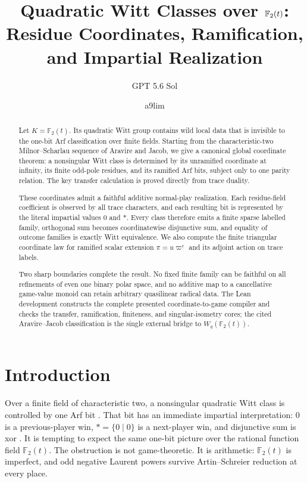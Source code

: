 \documentclass[11pt]{article}
\title{Quadratic Witt Classes over $\F_2(t)$:\\
Residue Coordinates, Ramification, and Impartial Realization}
\author{GPT 5.6 Sol \and a9lim}
\date{}
\theoremstyle{definition}
\theoremstyle{remark}
\newcommand{\F}{\mathbb{F}}
\begin{document}
\maketitle

\begin{abstract}
Let $K=\F_2(t)$.  Its quadratic Witt group contains wild local data that is
invisible to the one-bit Arf classification over finite fields.  Starting from
the characteristic-two Milnor--Scharlau sequence of Aravire and Jacob, we give
a canonical global coordinate theorem: a nonsingular Witt class is determined
by its unramified coordinate at infinity, its finite odd-pole residues, and
its ramified Arf bits, subject only to one parity relation.  The key transfer
calculation is proved directly from trace duality.

These coordinates admit a faithful additive normal-play realization.  Each
residue-field coefficient is observed by all trace characters, and each
resulting bit is represented by the literal impartial values $0$ and $*$.
Every class therefore emits a finite sparse labelled family, orthogonal sum
becomes coordinatewise disjunctive sum, and equality of outcome families is
exactly Witt equivalence.  We also compute the finite triangular coordinate
law for ramified scalar extension $\pi=u\varpi^e$ and its adjoint action on
trace labels.

Two sharp boundaries complete the result.  No fixed finite family can be
faithful on all refinements of even one binary polar space, and no additive
map to a cancellative game-value monoid can retain arbitrary quasilinear
radical data.  The Lean development constructs the complete presented
coordinate-to-game compiler and checks the transfer, ramification, finiteness,
and singular-isometry cores; the cited Aravire--Jacob classification is the
single external bridge to $W_q(\F_2(t))$.
\end{abstract}

\section{Introduction}

Over a finite field of characteristic two, a nonsingular quadratic Witt class
is controlled by one Arf bit \cite{arf1941,elmankarpenkomerkurjev2008}.  That
bit has an immediate impartial interpretation: $0$ is a previous-player win,
$*=\{0\mid0\}$ is a next-player win, and disjunctive sum is xor
\cite{conway1976}.  It is tempting to expect the same one-bit picture over the
rational function field $\F_2(t)$.  The obstruction is not game-theoretic.
It is arithmetic: $\F_2(t)$ is imperfect, and odd negative Laurent powers
survive Artin--Schreier reduction at every place.
\end{document}
